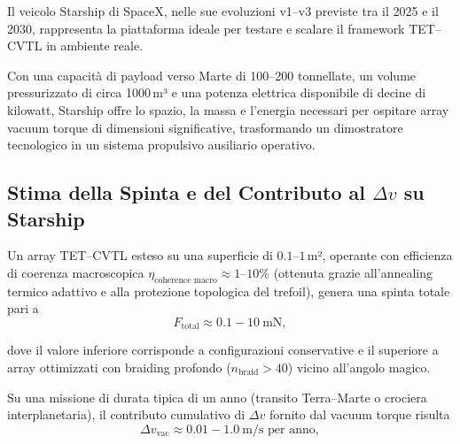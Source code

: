 \documentclass[11pt,a4paper]{article}
\theoremstyle{plain}
\theoremstyle{definition}
\begin{document}
\vspace{0.2cm}

Il veicolo Starship di SpaceX, nelle sue evoluzioni v1–v3 previste tra il 2025 e il 2030, rappresenta la piattaforma ideale per testare e scalare il framework TET--CVTL in ambiente reale. 

\vspace{0.2cm}

Con una capacità di payload verso Marte di 100–200 tonnellate, un volume pressurizzato di circa 1000\,m³ e una potenza elettrica disponibile di decine di kilowatt, Starship offre lo spazio, la massa e l’energia necessari per ospitare array vacuum torque di dimensioni significative, trasformando un dimostratore tecnologico in un sistema propulsivo ausiliario operativo.




\vspace{0.5cm}



\subsection{Stima della Spinta e del Contributo al $\Delta v$ su Starship}

\vspace{0.2cm}

Un array TET--CVTL esteso su una superficie di $0.1$–$1$\,m², operante con efficienza di coerenza macroscopica $\eta_{\text{coherence macro}} \approx 1$–$10\%$ (ottenuta grazie all’annealing termico adattivo e alla protezione topologica del trefoil), genera una spinta totale pari a
\begin{equation}
F_{\text{total}} \approx 0.1 - 10~\text{mN},
\label{eq:starship_thrust}
\end{equation}

\vspace{0.2cm}
dove il valore inferiore corrisponde a configurazioni conservative e il superiore a array ottimizzati con braiding profondo ($n_{\text{braid}} > 40$) vicino all’angolo magico.

\vspace{0.3cm}

Su una missione di durata tipica di un anno (transito Terra–Marte o crociera interplanetaria), il contributo cumulativo di $\Delta v$ fornito dal vacuum torque risulta
\begin{equation}
\Delta v_{\text{vac}} \approx 0.01 - 1.0~\text{m/s per anno},
\label{eq:starship_deltav}
\end{equation}
\end{document}
